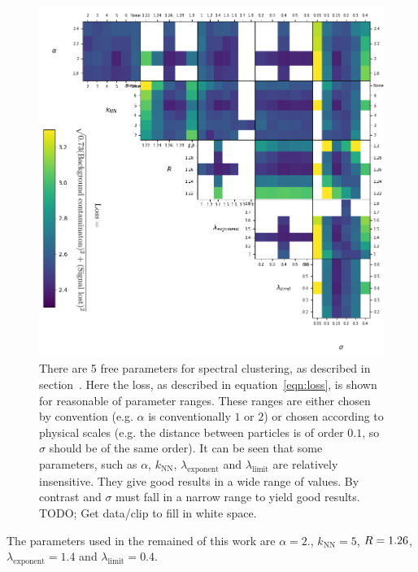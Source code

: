     \begin{figure}[htp]
            \includegraphics[width=1\textwidth]{graphics/trangle_scan_incomplete.png}
            \caption{There are 5 free parameters for spectral clustering,
                as described in section~.
                Here the loss, as described in equation~\ref{eqn:loss}, is shown for reasonable of parameter ranges.
                These ranges are either chosen by convention (e.g. \(\alpha\) is conventionally \(1\) or \(2\))
                or chosen according to physical scales (e.g. the distance between particles is of order \(0.1\),
                so \(\sigma\) should be of the same order).
                It can be seen that some parameters, such as \(\alpha\), \(k_\text{NN}\), \(\lambda_\text{exponent}\)
                and \(\lambda_\text{limit}\) are relatively insensitive.
                They give good results in a wide range of values.
                By contrast \stoppingdeltar{} and \(\sigma\) must fall in a narrow range to yield good results.
            {\color{red}TODO; Get data/clip to fill in white space.}
             }\label{fig:scan_spectral}
    \end{figure}    


    The parameters used in the remained of this work are \(\alpha=2.\), \(k_\text{NN}=5\), \(R{} = 1.26\), \(\lambda_\text{exponent} = 1.4\) and \(\lambda_\text{limit} = 0.4\).
